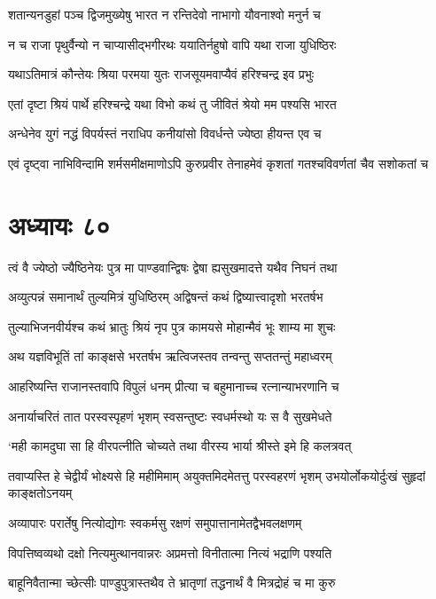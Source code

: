 \twolineshloka
{शतान्यनडुहां पञ्च द्विजमुख्येषु भारत}
{न रन्तिदेवो नाभागो यौवनाश्वो मनुर्न च}


\twolineshloka
{न च राजा पृथुर्वैन्यो न चाप्यासीद्भगीरथः}
{ययातिर्नहुषो वापि यथा राजा युधिष्ठिरः}


\twolineshloka
{यथाऽतिमात्रं कौन्तेयः श्रिया परमया युतः}
{राजसूयमवाप्यैवं हरिश्चन्द्र इव प्रभुः}


\twolineshloka
{एतां दृष्टा श्रियं पार्थे हरिश्चन्द्रे यथा विभो}
{कथं तु जीवितं श्रेयो मम पश्यसि भारत}


\twolineshloka
{अन्धेनेव युगं नद्धं विपर्यस्तं नराधिप}
{कनीयांसो विवर्धन्ते ज्येष्ठा हीयन्त एव च}


\twolineshloka
{एवं दृष्ट्वा नाभिविन्दामि शर्मसमीक्षमाणोऽपि कुरुप्रवीर}
{तेनाहमेवं कृशतां गतश्चविवर्णतां चैव सशोकतां च}


\chapter{अध्यायः ८०}
\twolineshloka
{त्वं वै ज्येष्ठो ज्यैष्ठिनेयः पुत्र मा पाण्डवान्द्विषः}
{द्वेषा ह्यसुखमादत्ते यथैव निघनं तथा}


\twolineshloka
{अव्युत्पन्नं समानार्थं तुल्यमित्रं युधिष्ठिरम्}
{अद्विषन्तं कथं द्विष्यात्त्वादृशो भरतर्षभ}


\twolineshloka
{तुल्याभिजनवीर्यश्च कथं भ्रातुः श्रियं नृप}
{पुत्र कामयसे मोहान्मैवं भूः शाम्य मा शुचः}


\twolineshloka
{अथ यज्ञविभूतिं तां काङ्क्षसे भरतर्षभ}
{ऋत्विजस्तव तन्वन्तु सप्ततन्तुं महाध्वरम्}


\twolineshloka
{आहरिष्यन्ति राजानस्तवापि विपुलं धनम्}
{प्रीत्या च बहुमानाच्च रत्नान्याभरणानि च}


\twolineshloka
{अनार्याचरितं तात परस्वस्पृहणं भृशम्}
{स्वसन्तुष्टः स्वधर्मस्थो यः स वै सुखमेधते}


\twolineshloka
{`मही कामदुघा सा हि वीरपत्नीति चोच्यते}
{तथा वीरस्य भार्या श्रीस्ते इमे हि कलत्रवत्}


तवाप्यस्ति हे चेद्वीर्यं भोक्ष्यसे हि महीमिमाम्
\twolineshloka
{अयुक्तमिदमेतत्तु परस्वहरणं भृशम्}
{उभयोर्लोकयोर्दुःखं सुहृदां काङ्क्षतोऽनयम्}


\twolineshloka
{अव्यापारः परार्तेषु नित्योद्योगः स्वकर्मसु}
{रक्षणं समुपात्तानामेतद्वैभवलक्षणम्}


\twolineshloka
{विपत्तिष्वव्यथो दक्षो नित्यमुत्थानवान्नरः}
{अप्रमत्तो विनीतात्मा नित्यं भद्राणि पश्यति}


\twolineshloka
{बाहूनिवैतान्मा च्छेत्सीः पाण्डुपुत्रास्तथैव ते}
{भ्रातृणां तद्धनार्थं वै मित्रद्रोहं च मा कुरु}


